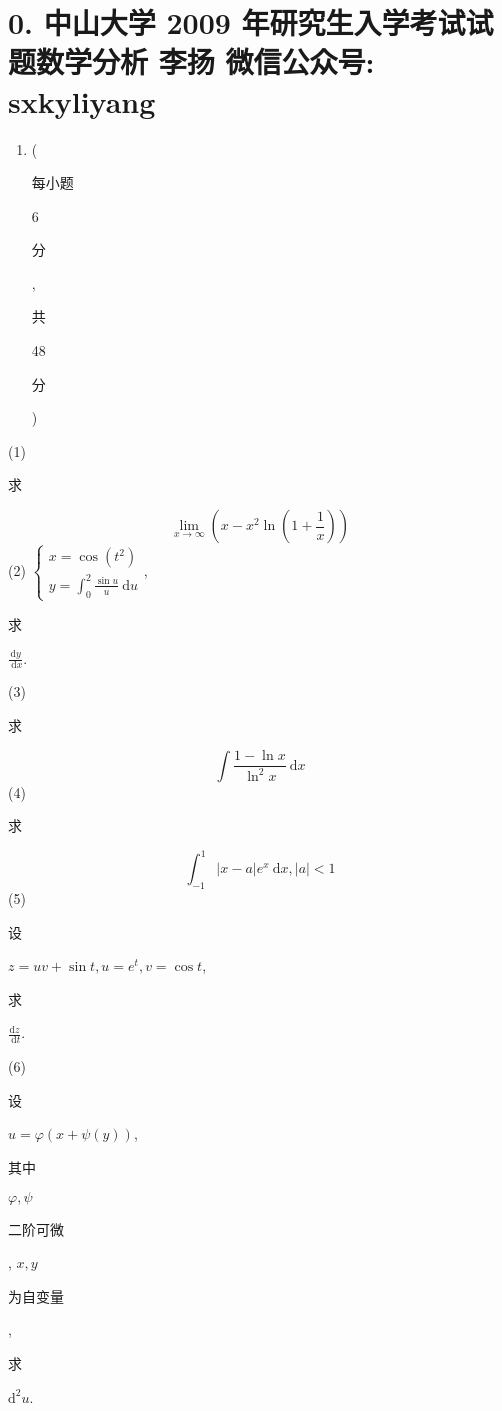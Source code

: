 \documentclass[10pt]{article}
\begin{document}
\section{0. 中山大学 2009 年研究生入学考试试题数学分析 
 李扬 
 微信公众号: sxkyliyang}
\begin{enumerate}
  \item (\begin{CJK}{UTF8}{mj}每小题\end{CJK} 6 \begin{CJK}{UTF8}{mj}分\end{CJK}, \begin{CJK}{UTF8}{mj}共\end{CJK} 48 \begin{CJK}{UTF8}{mj}分\end{CJK})
\end{enumerate}
(1) \begin{CJK}{UTF8}{mj}求\end{CJK}
$$
\lim _{x \rightarrow \infty}\left(x-x^{2} \ln \left(1+\frac{1}{x}\right)\right)
$$
(2) $\left\{\begin{array}{l}x=\cos \left(t^{2}\right) \\ y=\int_{0}^{2} \frac{\sin u}{u} \mathrm{~d} u\end{array}\right.$, \begin{CJK}{UTF8}{mj}求\end{CJK} $\frac{\mathrm{d} y}{\mathrm{~d} x}$.

(3) \begin{CJK}{UTF8}{mj}求\end{CJK}
$$
\int \frac{1-\ln x}{\ln ^{2} x} \mathrm{~d} x
$$
(4) \begin{CJK}{UTF8}{mj}求\end{CJK}
$$
\int_{-1}^{1}|x-a| e^{x} \mathrm{~d} x,|a|<1
$$
(5) \begin{CJK}{UTF8}{mj}设\end{CJK} $z=u v+\sin t, u=e^{t}, v=\cos t$, \begin{CJK}{UTF8}{mj}求\end{CJK} $\frac{\mathrm{d} z}{\mathrm{~d} t}$.

(6) \begin{CJK}{UTF8}{mj}设\end{CJK} $u=\varphi(x+\psi(y))$, \begin{CJK}{UTF8}{mj}其中\end{CJK} $\varphi, \psi$ \begin{CJK}{UTF8}{mj}二阶可微\end{CJK}, $x, y$ \begin{CJK}{UTF8}{mj}为自变量\end{CJK}, \begin{CJK}{UTF8}{mj}求\end{CJK} $\mathrm{d}^{2} u$.
\end{document}
